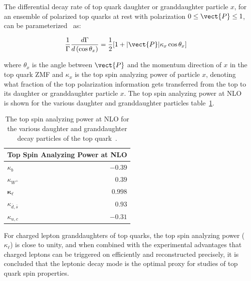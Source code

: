 The differential decay rate of top quark daughter or granddaughter particle $x$, for an ensemble of polarized top quarks at rest with polarization $0 \leq \vect{P} \leq 1$, can be parameterized~\cite{BRANDENBURG2002235} as:
\begin{linenomath*}
\begin{align}
\frac{1}{\Gamma} \frac{d \Gamma}{d\left(\cos \theta_x\right)}=\frac{1}{2}[1+ \vert \vect{P} \vert \kappa_x \cos \theta_x]
\end{align}
\end{linenomath*}
where $\theta_x$ is the angle between $\vect{P}$ and the momentum direction of $x$ in the top quark ZMF and $\kappa_x$ is the top spin analyzing power of particle $x$, denoting what fraction of the top polarization information gets transferred from the top to its daughter or granddaughter particle $x$.
The top spin analyzing power at NLO is shown for the various daughter and granddaughter particles table~\ref{spin_analyzing_power_NLO}.
\begin{table}[!htb]
\begin{center}
\begin{tabular}{lr}
\multicolumn{2}{c}{ Top Spin Analyzing Power at NLO } \\
\hline$\kappa_b$ & $-0.39$ \\
$\kappa_{W^{+}}$ & $0.39$ \\
$\boldsymbol{\kappa}_{\ell}$ & $\mathbf{0.998}$ \\
$\kappa_{\bar{d}, \bar{s}}$ & $0.93$ \\
$\kappa_{u, c}$ & $-0.31$
\end{tabular}
\caption{The top spin analyzing power at NLO for the various daughter and granddaughter decay particles of the top quark~\cite{BRANDENBURG2002235}.
         }
\label{spin_analyzing_power_NLO}
\end{center}
\end{table}
For charged lepton granddaughters of top quarks, the top spin analyzing power ($\kappa_\ell$) is close to unity, and when combined with the experimental advantages that charged leptons can be triggered on efficiently and reconstructed precisely, it is concluded that the leptonic decay mode is the optimal proxy for studies of top quark spin properties.

